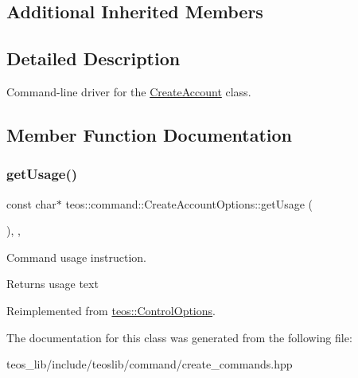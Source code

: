 \subsection*{Additional Inherited Members}


\subsection{Detailed Description}
Command-\/line driver for the \mbox{\hyperlink{classteos_1_1command_1_1_create_account}{Create\+Account}} class. 

\subsection{Member Function Documentation}
\mbox{\label{classteos_1_1command_1_1_create_account_options_af5c13799a676966824e5e9e47b1af180}} 
\subsubsection{\texorpdfstring{get\+Usage()}{getUsage()}}
{\footnotesize\ttfamily const char$\ast$ teos\+::command\+::\+Create\+Account\+Options\+::get\+Usage (\begin{DoxyParamCaption}{ }\end{DoxyParamCaption})\hspace{0.3cm}{\ttfamily [inline]}, {\ttfamily [protected]}, {\ttfamily [virtual]}}



Command \textquotesingle{}usage\textquotesingle{} instruction. 

\begin{DoxyReturn}{Returns}
usage text 
\end{DoxyReturn}


Reimplemented from \mbox{\hyperlink{classteos_1_1_control_options_a0aa5671f9bc750ed5280c26c543874f3}{teos\+::\+Control\+Options}}.



The documentation for this class was generated from the following file\+:\begin{DoxyCompactItemize}
\item 
teos\+\_\+lib/include/teoslib/command/create\+\_\+commands.\+hpp\end{DoxyCompactItemize}

